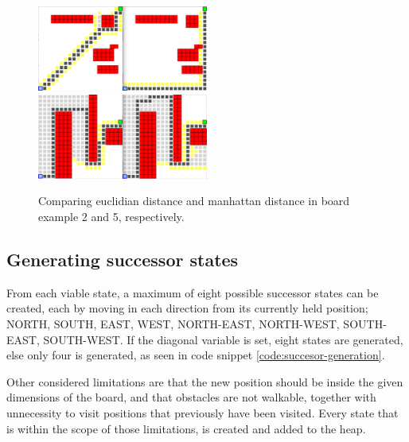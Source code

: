 \begin{figure}[h!]
	\centering
	\begin{minipage}{\textwidth}
		\includegraphics[width=0.5\textwidth]{module_1/images/run_ex2}
		\includegraphics[width=0.5\textwidth]{module_1/images/run_ex5}
	\end{minipage}
	\caption{Comparing euclidian distance and manhattan distance in board example 2 and 5, respectively.}
	\label{run:examples}
\end{figure}

\subsection{Generating successor states}
From each viable state, a maximum of eight possible successor states can be created, each by moving in each direction from its currently held position; NORTH, SOUTH, EAST, WEST, NORTH-EAST, NORTH-WEST, SOUTH-EAST, SOUTH-WEST. If the diagonal variable is set, eight states are generated, else only four is generated, as seen in code snippet \ref{code:succesor-generation}.

Other considered limitations are that the new position should be inside the given dimensions of the board, and that obstacles are not walkable, together with unnecessity to visit positions that previously have been visited. Every state that is within the scope of those limitations, is created and added to the heap. 



